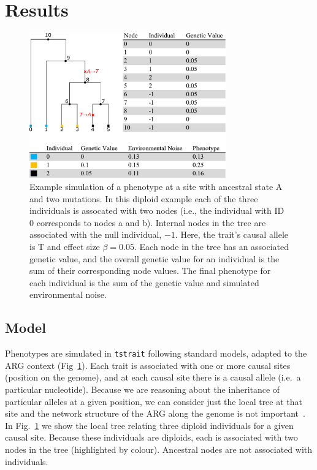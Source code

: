 \documentclass[unnumsec,webpdf,modern,large,namedate]{oup-authoring-template}%
\begin{document}
\section{Results}
\begin{figure}[t]%
\centering
\includegraphics[width=240pt]{figures/tree-illustration.pdf}
\caption{Example simulation of a phenotype at a site with ancestral state A and
two mutations. In this diploid example each of the three individuals
is assocated with two nodes (i.e., the individual with ID 0 corresponds
to nodes \textsf{a} and \textsf{b}). Internal nodes in the tree are associated
with the null individual, $-1$. Here, the trait's causal allele is T
and effect size $\beta=0.05$. Each node in the tree has an associated
genetic value, and the overall genetic value for an individual is the
sum of their corresponding node values. The final phenotype
for each individual is the sum of the genetic value and
simulated environmental noise.
\label{fig:tree-illustration}}
\end{figure}

\subsection{Model}
Phenotypes are simulated in \texttt{tstrait} following standard
models, adapted to the ARG context (Fig~\ref{fig:tree-illustration}).
Each trait is associated with one or more causal sites (position
on the genome), and at each causal site there is a causal allele
(i.e.\ a particular nucleotide). Because we are reasoning
about the inheritance of particular alleles at a given position,
we can consider just the local tree at that site and
the network structure of the ARG along the genome is not
important~\citep{wong2023general}. In
Fig.~\ref{fig:tree-illustration} we show the local tree
relating three diploid individuals for a given causal site.
Because these individuals are diploids, each is associated
with two nodes in the tree (highlighted by colour). Ancestral
nodes are not associated with individuals.
\end{document}
